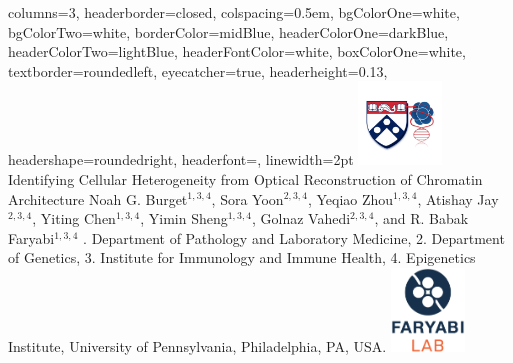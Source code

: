 \documentclass[landscape,a0paper,fontscale=0.285]{baposter} %
\begin{document}
\begin{poster}
{
columns=3,
headerborder=closed, %
colspacing=0.5em, %
bgColorOne=white, %
bgColorTwo=white, %
borderColor=midBlue, %
headerColorOne=darkBlue, %
headerColorTwo=lightBlue, %
headerFontColor=white, %
boxColorOne=white, %
textborder=roundedleft, %
eyecatcher=true, %
headerheight=0.13\textheight, %
headershape=roundedright, %
headerfont=\Large\textsc, %
linewidth=2pt %
}
%
{\includegraphics[height=6em]{epi.png}} %
{\huge{Identifying Cellular Heterogeneity from Optical Reconstruction of Chromatin Architecture}} %
{\small{Noah G. Burget$^{1,3,4}$, Sora Yoon$^{2,3,4}$, Yeqiao Zhou$^{1,3,4}$, Atishay Jay$^{2,3,4}$, Yiting Chen$^{1,3,4}$, Yimin Sheng$^{1,3,4}$, Golnaz Vahedi$^{2,3,4}$, and R. Babak Faryabi$^{1,3,4}$ . Department of Pathology and Laboratory Medicine, 2. Department of Genetics, 3. Institute for Immunology and Immune Health, 4. Epigenetics Institute, University of Pennsylvania, Philadelphia, PA, USA. }} %
{\includegraphics[height=6em]{LabLogo.pdf}} %


\end{poster}
\end{document}
